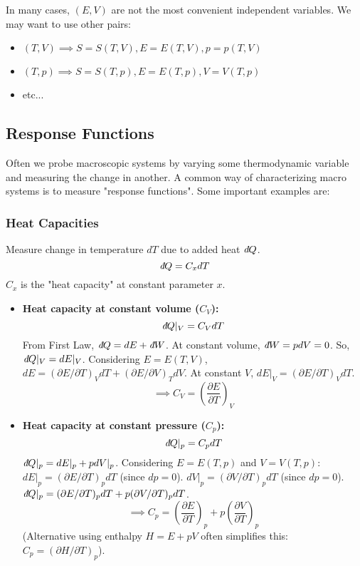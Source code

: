 \documentclass[11pt]{article}
\newcommand{\pderiv}[2]{\frac{\partial #1}{\partial #2}}
\newcommand{\ethbar}{\text{\it{đ}}} %
\begin{document}
In many cases, $(E,V)$ are not the most convenient independent variables. We may want to use other pairs:
\begin{itemize}
    \item $(T, V) \implies S=S(T,V), E=E(T,V), p=p(T,V)$
    \item $(T, p) \implies S=S(T,p), E=E(T,p), V=V(T,p)$
    \item etc...
\end{itemize}

\subsection*{Response Functions}

Often we probe macroscopic systems by varying some thermodynamic variable and measuring the change in another. A common way of characterizing macro systems is to measure "response functions". Some important examples are:

\subsubsection*{Heat Capacities}
Measure change in temperature $dT$ due to added heat $\ethbar Q$.
\[ \ethbar Q = C_x dT \]
$C_x$ is the "heat capacity" at constant parameter $x$.
\begin{itemize}
    \item \textbf{Heat capacity at constant volume ($C_V$):}
    \[ \ethbar Q |_V = C_V dT \]
    From First Law, $\ethbar Q = dE + \ethbar W$. At constant volume, $\ethbar W = p dV = 0$.
    So, $\ethbar Q |_V = dE |_V$.
    Considering $E=E(T,V)$, $dE = (\partial E / \partial T)_V dT + (\partial E / \partial V)_T dV$.
    At constant $V$, $dE|_V = (\partial E / \partial T)_V dT$.
    \[ \implies C_V = \left( \pderiv{E}{T} \right)_V \]

    \item \textbf{Heat capacity at constant pressure ($C_p$):}
    \[ \ethbar Q |_p = C_p dT \]
    $\ethbar Q |_p = dE |_p + p dV |_p$.
    Considering $E=E(T,p)$ and $V=V(T,p)$:
    $dE|_p = (\partial E / \partial T)_p dT$ (since $dp=0$).
    $dV|_p = (\partial V / \partial T)_p dT$ (since $dp=0$).
    $\ethbar Q |_p = (\partial E / \partial T)_p dT + p (\partial V / \partial T)_p dT$.
    \[ \implies C_p = \left( \pderiv{E}{T} \right)_p + p \left( \pderiv{V}{T} \right)_p \]
    (Alternative using enthalpy $H=E+pV$ often simplifies this: $C_p = (\partial H / \partial T)_p$).
\end{itemize}
\end{document}
